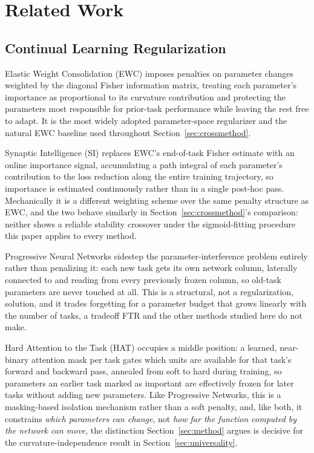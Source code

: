\documentclass[11pt]{article}
\begin{document}
\section{Related Work}
\label{sec:related}

\subsection{Continual Learning Regularization}
Elastic Weight Consolidation (EWC) \citep{kirkpatrick2017overcoming} imposes
penalties on parameter changes weighted by the diagonal Fisher information
matrix, treating each parameter's importance as proportional to its
curvature contribution and protecting the parameters most responsible for
prior-task performance while leaving the rest free to adapt. It is the
most widely adopted parameter-space regularizer and the natural EWC
baseline used throughout Section~\ref{sec:crossmethod}.

Synaptic Intelligence (SI) \citep{zenke2017continual} replaces EWC's
end-of-task Fisher estimate with an online importance signal, accumulating
a path integral of each parameter's contribution to the loss reduction
along the entire training trajectory, so importance is estimated
continuously rather than in a single post-hoc pass. Mechanically it is a
different weighting scheme over the same penalty structure as EWC, and the
two behave similarly in Section~\ref{sec:crossmethod}'s comparison: neither
shows a reliable stability crossover under the sigmoid-fitting procedure
this paper applies to every method.

Progressive Neural Networks \citep{rusu2016progressive} sidestep the
parameter-interference problem entirely rather than penalizing it: each new
task gets its own network column, laterally connected to and reading from
every previously frozen column, so old-task parameters are never touched at
all. This is a structural, not a regularization, solution, and it trades
forgetting for a parameter budget that grows linearly with the number of
tasks, a tradeoff FTR and the other methods studied here do not make.

Hard Attention to the Task (HAT) \citep{serra2018overcoming} occupies a
middle position: a learned, near-binary attention mask per task gates which
units are available for that task's forward and backward pass, annealed
from soft to hard during training, so parameters an earlier task marked as
important are effectively frozen for later tasks without adding new
parameters. Like Progressive Networks, this is a masking-based isolation
mechanism rather than a soft penalty, and, like both, it constrains
\emph{which parameters can change}, not \emph{how far the function
computed by the network can move}, the distinction Section~\ref{sec:method}
argues is decisive for the curvature-independence result in
Section~\ref{sec:universality}.
\end{document}
